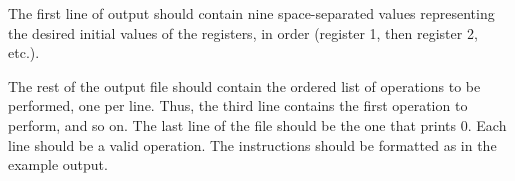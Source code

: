 The first line of output should contain nine space-separated values representing the desired initial values of the registers, in order (register 1, then register 2, etc.).

The rest of the output file should contain the ordered list of operations to be performed, one per line. Thus, the third line contains the first operation to perform, and so on. The last line of the file should be the one that prints 0. Each line should be a valid operation. The instructions should be formatted as in the example output.
